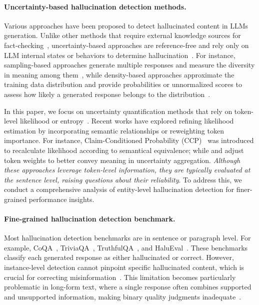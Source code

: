\paragraph{Uncertainty-based hallucination detection methods.}
Various approaches have been proposed to detect hallucinated content in LLMs generation.
Unlike other methods that require external knowledge sources for fact-checking~\citep{gou2024critic, chen-etal-2024-complex, min-etal-2023-factscore, huo2023retrieving}, uncertainty-based approaches are reference-free and rely only on LLM internal states or behaviors to determine hallucination~\citep{10.1145/3703155}. 
For instance, sampling-based approaches generate multiple responses and measure the diversity in meaning among them~\citep{fomicheva-etal-2020-unsupervised, kuhn2023semantic, lin2024generating}, while density-based approaches approximate the training data distribution and provide probabilities or unnormalized scores to assess how likely a generated response belongs to the distribution~\citep{yoo-etal-2022-detection, ren2023outofdistribution, vazhentsev-etal-2023-hybrid}.

In this paper, we focus on uncertainty quantification methods that rely on token-level likelihood or entropy~\citep{guerreiro-etal-2023-looking, malinin2021uncertainty}. 
Recent works have explored refining likelihood estimation by incorporating semantic relationships or reweighting token importance. For instance, Claim-Conditioned Probability (CCP)~\citep{fadeeva-etal-2024-fact} was introduced to recalculate likelihood according to semantical equivalence; while \citet{zhang-etal-2023-enhancing-uncertainty} and \citet{duan-etal-2024-shifting} adjust token weights to better convey meaning in uncertainty aggregation. \emph{Although these approaches leverage token-level information, they are typically evaluated at the sentence level, raising questions about their reliability}. To address this, we conduct a comprehensive analysis of entity-level hallucination detection for finer-grained performance insights.


\paragraph{Fine-grained hallucination detection benchmark.}

Most hallucination detection benchmarks are in sentence or paragraph level. For example, CoQA~\citep{reddy-etal-2019-coqa}, TriviaQA~\citep{joshi-etal-2017-triviaqa}, TruthfulQA~\citep{lin-etal-2022-truthfulqa}, and HaluEval~\citep{li-etal-2023-halueval}. These benchmarks classify each generated response as either hallucinated or correct. However, instance-level detection cannot pinpoint specific hallucinated content, which is crucial for correcting misinformation~\citep{cattan2024localizingfactualinconsistenciesattributable}. This limitation becomes particularly problematic in long-form text, where a single response often combines supported and unsupported information, making binary quality judgments inadequate~\citep{min-etal-2023-factscore}.

